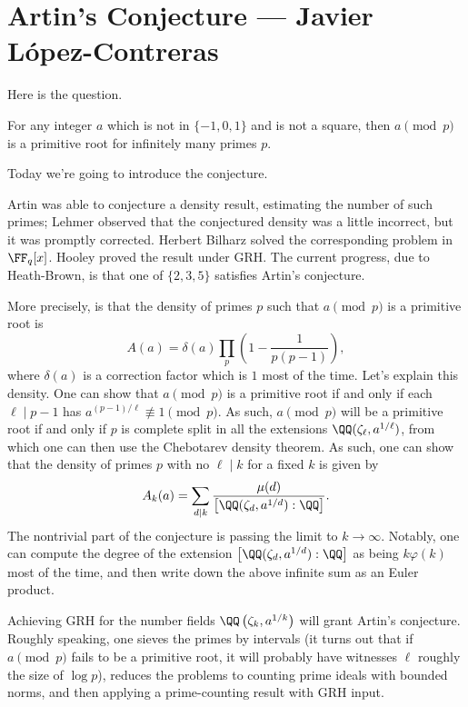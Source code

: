 \documentclass{article}
\begin{document}
\section{Artin's Conjecture --- Javier L\'opez-Contreras}
Here is the question.
\begin{conj}[Artin] \label{conj:artin}
	For any integer $a$ which is not in $\{-1,0,1\}$ and is not a square, then $a\pmod p$ is a primitive root for infinitely many primes $p$.
\end{conj}
Today we're going to introduce the conjecture.
\begin{remark}
	Artin was able to conjecture a density result, estimating the number of such primes; Lehmer observed that the conjectured density was a little incorrect, but it was promptly corrected. Herbert Bilharz solved the corresponding problem in $\FF_q[x]$. Hooley proved the result under GRH. The current progress, due to Heath-Brown, is that one of $\{2,3,5\}$ satisfies Artin's conjecture.
\end{remark}
More precisely,  is that the density of primes $p$ such that $a\pmod p$ is a primitive root is
\[A(a)=\delta(a)\prod_p\left(1-\frac1{p(p-1)}\right),\]
where $\delta(a)$ is a correction factor which is $1$ most of the time. Let's explain this density. One can show that $a\pmod p$ is a primitive root if and only if each $\ell\mid p-1$ has $a^{(p-1)/\ell}\not\equiv1\pmod p$. As such, $a\pmod p$ will be a primitive root if and only if $p$ is complete split in all the extensions $\QQ(\zeta_\ell,a^{1/\ell})$, from which one can then use the Chebotarev density theorem. As such, one can show that the density of primes $p$ with no $\ell\mid k$ for a fixed $k$ is given by
\[A_k(a)=\sum_{d\mid k}\frac{\mu(d)}{\left[\QQ(\zeta_d,a^{1/d}):\QQ\right]}.\]
The nontrivial part of the conjecture is passing the limit to $k\to\infty$. Notably, one can compute the degree of the extension $\left[\QQ(\zeta_d,a^{1/d}):\QQ\right]$ as being $k\varphi(k)$ most of the time, and then write down the above infinite sum as an Euler product.
\begin{remark}[Hooley]
	Achieving GRH for the number fields $\QQ\left(\zeta_k,a^{1/k}\right)$ will grant Artin's conjecture. Roughly speaking, one sieves the primes by intervals (it turns out that if $a\pmod p$ fails to be a primitive root, it will probably have witnesses $\ell$ roughly the size of $\log p$), reduces the problems to counting prime ideals with bounded norms, and then applying a prime-counting result with GRH input.
\end{remark}
\end{document}
